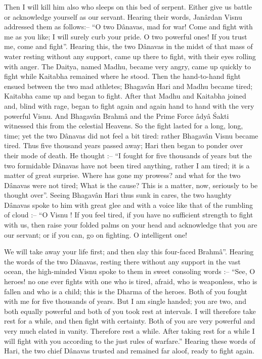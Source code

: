 Then I will kill him also who sleeps on this bed of serpent. Either give us battle or acknowledge yourself as our servant. Hearing their words, Jan\^ardan Visnu addressed them as follows:-- ``O two D\^anavas, mad for war! Come and fight with me as you like; I will surely curb your pride. O two powerful ones! If you trust me, come and fight''. Hearing this, the two D\^anavas in the midst of that mass of water resting without any support, came up there to fight, with their eyes rolling with anger. The Daitya, named Madhu, became very angry, came up quickly to fight while Kaitabha remained where he stood. Then the hand-to-hand fight ensued between the  two mad athletes; Bhagav\^an Hari and Madhu became tired; Kaitabha came up and began to fight. After that Madhu and Kaitabha joined and, blind with rage, began to fight again and again hand to hand with the very powerful Visnu. And Bhagav\^an Brahm\^a and the Prime Force \^ady\^a \'Sakti witnessed this from the celestial Heavens. So the fight lasted for a long, long, time; yet the two D\^anavas did not feel a bit tired: rather Bhagav\^an Visnu became tired. Thus five thousand years passed away; Hari then began to ponder over their mode of death. He thought :-- ``I fought for five thousands of years but the two formidable D\^anavas have not been tired anything, rather I am tired; it is a matter of great surprise. Where has gone my prowess? and what for the two D\^anavas were not tired; What is the cause? This is a matter, now, seriously to be thought over''. Seeing Bhagav\^an Hari thus sunk in cares, the two haughty D\^anavas spoke to him with great glee and with a voice like that of the rumbling of cloud :-- ``O Visnu ! If you feel tired, if you have no sufficient strength to fight with us, then raise your folded palms on your head and acknowledge that you are our servant; or if you can, go on fighting. O intelligent one!

We will take away your life first; and then slay this four-faced Brahm\^a''. Hearing the words of the two D\^anavas, resting there without any support in the vast ocean, the high-minded Visnu spoke to them in sweet consoling words :-- ``See, O heroes! no one ever fights with one who is tired, afraid, who is weaponless, who is fallen and who is a child; this is the Dharma of the heroes. Both of you fought with me for five thousands of years. But I am single handed; you are two, and both equally powerful and both of you took rest at intervals. I will therefore take rest for a while, and then fight with certainty. Both of you are very powerful and very much elated in vanity. Therefore rest a while. After taking rest for a while I will fight with you according to the just rules of warfare.'' Hearing these words of Hari, the two chief D\^anavas trusted and remained far aloof, ready to fight again.

